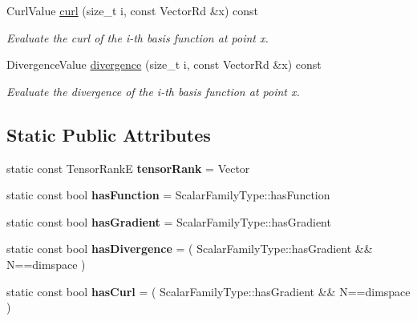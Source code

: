 \begin{DoxyCompactItemize}
Curl\+Value \hyperlink{classHArDCore3D_1_1TensorizedVectorFamily_a2ed39faecc4dbb67d0ec8125f9a61366}{curl} (size\+\_\+t i, const Vector\+Rd \&x) const
\begin{DoxyCompactList}\small\item\em Evaluate the curl of the i-\/th basis function at point x. \end{DoxyCompactList}\item 
\mbox{\label{classHArDCore3D_1_1TensorizedVectorFamily_a7c792e5a5a1c364a53d9da3ac7d4ba11}} 
Divergence\+Value \hyperlink{classHArDCore3D_1_1TensorizedVectorFamily_a7c792e5a5a1c364a53d9da3ac7d4ba11}{divergence} (size\+\_\+t i, const Vector\+Rd \&x) const
\begin{DoxyCompactList}\small\item\em Evaluate the divergence of the i-\/th basis function at point x. \end{DoxyCompactList}\end{DoxyCompactItemize}
\subsection*{Static Public Attributes}
\begin{DoxyCompactItemize}
\item 
\mbox{\label{classHArDCore3D_1_1TensorizedVectorFamily_a885e56bf6d22b2bccfd8dc8f57e1796a}} 
static const Tensor\+RankE {\bfseries tensor\+Rank} = Vector
\item 
\mbox{\label{classHArDCore3D_1_1TensorizedVectorFamily_a9b13b73400eb42f3860a261232954deb}} 
static const bool {\bfseries has\+Function} = Scalar\+Family\+Type\+::has\+Function
\item 
\mbox{\label{classHArDCore3D_1_1TensorizedVectorFamily_ad979bfdf5ecf01b03fe58afa3a367319}} 
static const bool {\bfseries has\+Gradient} = Scalar\+Family\+Type\+::has\+Gradient
\item 
\mbox{\label{classHArDCore3D_1_1TensorizedVectorFamily_af7b0b7d38444c6f5948a7af77f54cb76}} 
static const bool {\bfseries has\+Divergence} = ( Scalar\+Family\+Type\+::has\+Gradient \&\& N==dimspace )
\item 
\mbox{\label{classHArDCore3D_1_1TensorizedVectorFamily_ac508be3ba29add3055e394ea73413f3d}} 
static const bool {\bfseries has\+Curl} = ( Scalar\+Family\+Type\+::has\+Gradient \&\& N==dimspace )
\end{DoxyCompactItemize}


